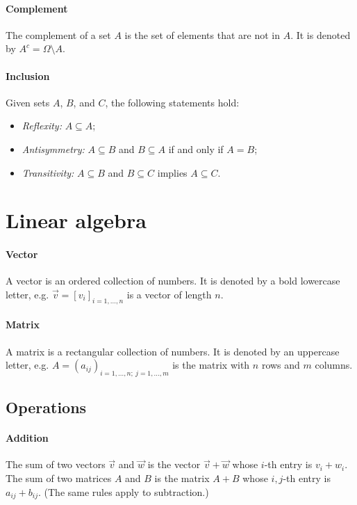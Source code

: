 \paragraph{Complement}  The complement of a set $A$ is the set of elements that are not
in $A$.  It is denoted by $A^c = \Omega \setminus A$.

\paragraph{Inclusion}  Given sets $A$, $B$, and $C$, the following statements hold:
\begin{itemize}
  \item \emph{Reflexity:} $A \subseteq A$;
  \item \emph{Antisymmetry:} $A \subseteq B$ and $B \subseteq A$ if and only if $A = B$;
  \item \emph{Transitivity:} $A \subseteq B$ and $B \subseteq C$ implies $A \subseteq C$.
\end{itemize}

\section{Linear algebra}

\paragraph{Vector}  A vector is an ordered collection of numbers.  It is denoted by a bold
lowercase letter, e.g. $\vec{v} = [v_i]_{i= 1,\dots, n}$ is a vector of length $n$.

\paragraph{Matrix}  A matrix is a rectangular collection of numbers.  It is denoted by an
uppercase letter, e.g. $A = (a_{ij})_{i = 1, \dots, n;~j = 1, \dots, m}$ is the matrix
with $n$ rows and $m$ columns.

\subsection{Operations}

\paragraph{Addition}  The sum of two vectors $\vec{v}$ and $\vec{w}$ is the vector
$\vec{v} + \vec{w}$ whose $i$-th entry is $v_i + w_i$.  The sum of two matrices $A$ and
$B$ is the matrix $A + B$ whose $i, j$-th entry is $a_{ij} + b_{ij}$.  (The same rules apply
to subtraction.)

